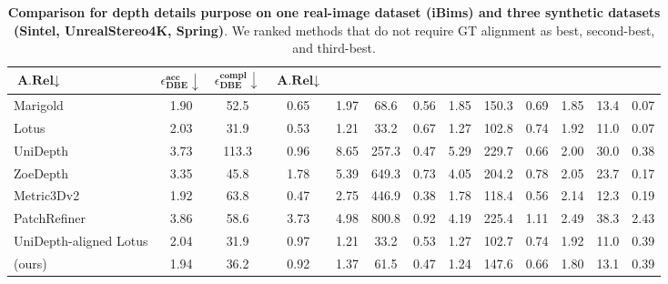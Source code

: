 \begin{table}[t]
{\begin{tabular}{l ccc ccc ccc ccc}
         \textbf{$\textbf{A.Rel}\downarrow$ }& $\epsilon^{\textbf{acc}}_{\textbf{DBE}}\downarrow$ & $\epsilon^{\textbf{compl}}_{\textbf{DBE}}\downarrow$&
         \textbf{$\textbf{A.Rel}\downarrow$} \\
        \toprule
        Marigold~\cite{marigold} & 1.90 & 52.5 & 0.65 & 1.97 & 68.6 &  0.56 & 1.85 & 150.3 & 0.69 & 1.85 & 13.4 & 0.07\\
        Lotus~\cite{he2024lotus} & 2.03 & 31.9 & 0.53 & 1.21 & 33.2 & 0.67 & 1.27 & 102.8 & 0.74 &1.92 & 11.0 & 0.07 \\
        \midrule
        UniDepth~\cite{piccinelli2024unidepth} & 3.73 & 113.3 & \cellcolor{tabthird!170} 0.96 & 8.65 & \cellcolor{tabthird!170} 257.3 & \cellcolor{tabsecond!170} 0.47 & 5.29 & 229.7 & \cellcolor{tabsecond!170} 0.66 & \cellcolor{tabthird!170} 2.00 & 30.0 & \cellcolor{tabthird!170} 0.38\\
        ZoeDepth~\cite{zoedepth} & 3.35 & \cellcolor{tabthird!170} 45.8 & 1.78 & 5.39 & 649.3 & 0.73 & 4.05 & 204.2 & 0.78 & 2.05 & 23.7 & \cellcolor{tabfirst!170} 0.17\\
        Metric3Dv2~\cite{hu2024metric3d} & \cellcolor{tabfirst!170} 1.92 & 63.8 & \cellcolor{tabfirst!170} 0.47 & \cellcolor{tabthird!170} 2.75 & 446.9 & \cellcolor{tabfirst!170} 0.38 & \cellcolor{tabthird!170} 1.78 & \cellcolor{tabsecond!170} 118.4 & \cellcolor{tabfirst!170} 0.56 & 2.14 & \cellcolor{tabsecond!170} 12.3 & \cellcolor{tabsecond!170} 0.19\\
        PatchRefiner~\cite{li2025patchrefiner} & 3.86 & 58.6 & 3.73 & 4.98 & 800.8 & 0.92 & 4.19 & 225.4 & 1.11 & 2.49 & 38.3 & 2.43\\
        UniDepth-aligned Lotus & \cellcolor{tabthird!170} 2.04 & \cellcolor{tabfirst!170} 31.9 &  0.97 & \cellcolor{tabfirst!170} 1.21 & \cellcolor{tabfirst!170} 33.2 & \cellcolor{tabthird!170} 0.53 & \cellcolor{tabsecond!170} 1.27 & \cellcolor{tabfirst!170} 102.7 & \cellcolor{tabthird!170} 0.74 & \cellcolor{tabsecond!170} 1.92 & \cellcolor{tabfirst!170} 11.0 & 0.39 \\
        \midrule
        (ours) & \cellcolor{tabsecond!170} 1.94 &  \cellcolor{tabsecond!170} 36.2 & \cellcolor{tabsecond!170} 0.92 & \cellcolor{tabsecond!170} 1.37 & \cellcolor{tabsecond!170} 61.5 & \cellcolor{tabsecond!170} 0.47 & \cellcolor{tabfirst!170} 1.24 & \cellcolor{tabthird!170} 147.6 & \cellcolor{tabsecond!170} 0.66 & \cellcolor{tabfirst!170} 1.80 & \cellcolor{tabthird!170} 13.1 & 0.39\\
        \bottomrule
    \end{tabular}}
\vspace{-5pt}
\caption{\textbf{Comparison for depth details purpose on one real-image dataset (iBims) and three synthetic datasets (Sintel, UnrealStereo4K, Spring)}. We ranked methods that do not require GT alignment as \colorbox{tabfirst!170}{best}, \colorbox{tabsecond!170}{second-best}, and \colorbox{tabthird!170}{third-best}.}

    \label{tab:results:zeroshot:detail}
\end{table}

